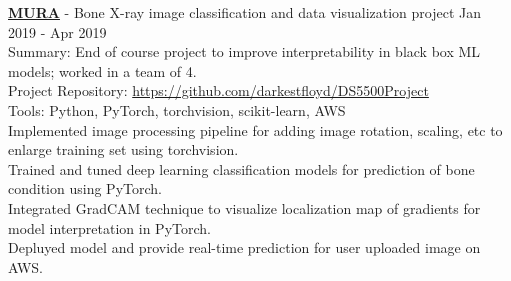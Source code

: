\documentclass[a4paper]{article}
\newcommand{\mybullet}{
	\indent 
  \textbullet \hspace*{2mm}
}
\begin{document}
      \noindent
      \textbf{\href{https://github.com/darkestfloyd/DS5500Project}{MURA}} - Bone X-ray image 
      classification and data visualization project \hfill Jan 2019 - Apr 2019 \\
      Summary: End of course project to improve interpretability in black box ML models; worked in a team of 4. \\
      \hfill Project Repository: \href{https://github.com/darkestfloyd/DS5500Project}{https://github.com/darkestfloyd/DS5500Project}\\
      Tools: Python, PyTorch, torchvision, scikit-learn, AWS \\
      \mybullet Implemented image processing pipeline for adding image rotation, scaling, etc to enlarge training set using torchvision. \\
      \mybullet Trained and tuned deep learning classification models for prediction of bone condition using PyTorch. \\
      \mybullet Integrated GradCAM technique to visualize localization map of gradients for model interpretation in PyTorch. \\
      \mybullet Depluyed model and provide real-time prediction for user uploaded image on AWS. \\
\end{document}
